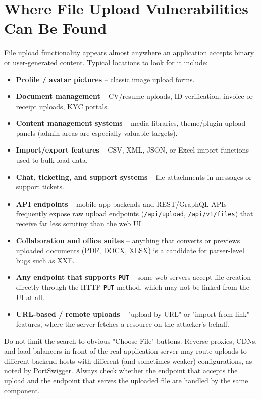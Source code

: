 \documentclass[11pt]{article}
\begin{document}
\section{Where File Upload Vulnerabilities Can Be Found}

File upload functionality appears almost anywhere an application accepts binary or user-generated content. Typical locations to look for it include:

\begin{itemize}[leftmargin=1.4em]
    \item \textbf{Profile / avatar pictures} -- classic image upload forms.
    \item \textbf{Document management} -- CV/resume uploads, ID verification, invoice or receipt uploads, KYC portals.
    \item \textbf{Content management systems} -- media libraries, theme/plugin upload panels (admin areas are especially valuable targets).
    \item \textbf{Import/export features} -- CSV, XML, JSON, or Excel import functions used to bulk-load data.
    \item \textbf{Chat, ticketing, and support systems} -- file attachments in messages or support tickets.
    \item \textbf{API endpoints} -- mobile app backends and REST/GraphQL APIs frequently expose raw upload endpoints (\texttt{/api/upload}, \texttt{/api/v1/files}) that receive far less scrutiny than the web UI.
    \item \textbf{Collaboration and office suites} -- anything that converts or previews uploaded documents (PDF, DOCX, XLSX) is a candidate for parser-level bugs such as XXE.
    \item \textbf{Any endpoint that supports \texttt{PUT}} -- some web servers accept file creation directly through the HTTP \texttt{PUT} method, which may not be linked from the UI at all.
    \item \textbf{URL-based / remote uploads} -- "upload by URL" or "import from link" features, where the server fetches a resource on the attacker's behalf.
\end{itemize}

\begin{note}
Do not limit the search to obvious "Choose File" buttons. Reverse proxies, CDNs, and load balancers in front of the real application server may route uploads to different backend hosts with different (and sometimes weaker) configurations, as noted by PortSwigger. Always check whether the endpoint that accepts the upload and the endpoint that serves the uploaded file are handled by the same component.
\end{note}
\end{document}
